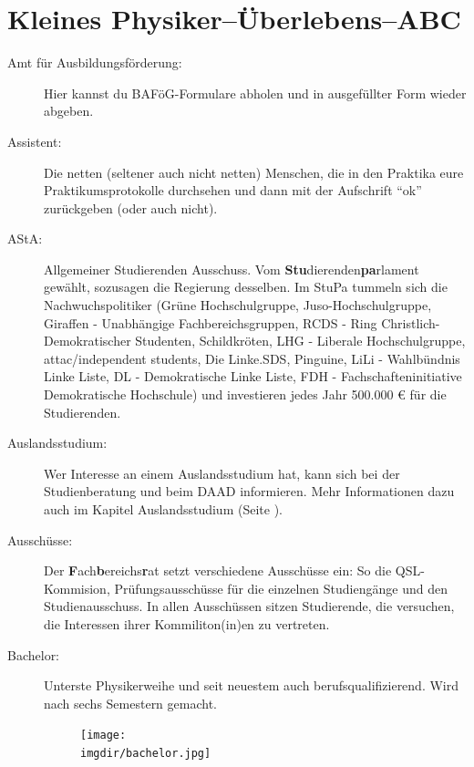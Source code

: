 \section{Kleines Physiker--Überlebens--ABC}
\label{sec:überlebens_abc}
\begin{description}
    \item[Amt für Ausbildungsförderung:] Hier kannst du BAFöG-Formulare
abholen und in ausgefüllter Form wieder abgeben.

    \item[Assistent:] Die
netten (seltener auch nicht netten) Menschen, die in den Praktika
eure Praktikumsprotokolle durchsehen und dann mit der Aufschrift
\enquote{ok} zurückgeben (oder auch nicht).

    \item[AStA:]Allgemeiner Studierenden Ausschuss.
      Vom \textbf{Stu}dierenden\textbf{pa}rlament gewählt, sozusagen die Regierung desselben.
      Im StuPa tummeln sich die Nachwuchspolitiker
      (Grüne Hochschulgruppe, Juso-Hochschulgruppe, Giraffen - Unabhängige Fachbereichsgruppen,
      RCDS - Ring Christlich-Demokratischer Studenten, Schildkröten, LHG - Liberale Hochschulgruppe,
      attac/independent students, Die Linke.SDS, Pinguine, LiLi - Wahlbündnis Linke Liste,
      DL - Demokratische Linke Liste, FDH - Fachschafteninitiative Demokratische Hochschule)
      und investieren jedes Jahr 500.000 \euro{} für die Studierenden.

    \item[Auslandsstudium:]Wer Interesse an einem Auslandsstudium hat, kann sich bei der Studienberatung
      und beim DAAD informieren.
      Mehr Informationen dazu auch im Kapitel Auslandsstudium (Seite \pageref{sec:Ausland}).

    \item[Ausschüsse:]Der \textbf{F}ach\textbf{b}ereichs\textbf{r}at setzt
verschiedene Ausschüsse ein: So die QSL-Kommision, Prüfungsausschüsse für die einzelnen Studiengänge
und den Studienausschuss.
In allen Ausschüssen sitzen Studierende, die versuchen, die Interessen ihrer Kommiliton(in)en zu
vertreten.

    \item[Bachelor:]Unterste Physikerweihe und seit neuestem auch
berufsqualifizierend. Wird nach sechs Semestern gemacht.

\begin{figure}[!h]
	\centering
  	\texttt{[image: \\imgdir/bachelor.jpg]}
\end{figure}


\end{description}
